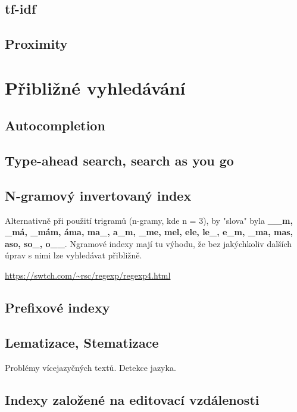 \documentclass[11pt]{article}
\begin{document}
\subsection{tf-idf}
\subsection{Proximity}

\section{Přibližné vyhledávání}

\subsection{Autocompletion}

\subsection{Type-ahead search, search as you go}

\subsection{N-gramový invertovaný index}
Alternativně při použití trigramů (n-gramy, kde n = 3), by "slova" byla
\textbf{\_\_m, \_má, \_mám, áma, ma\_, a\_m, \_me, mel, ele, le\_, e\_m, \_ma,
mas, aso, so\_, o\_\_}. Ngramové indexy mají tu výhodu, že bez jakýchkoliv
dalších úprav s nimi lze vyhledávat přibližně. 

\url{https://swtch.com/~rsc/regexp/regexp4.html}
\subsection{Prefixové indexy}

\subsection{Lematizace, Stematizace}
Problémy vícejazyčných textů. Detekce jazyka.

\subsection{Indexy založené na editovací vzdálenosti}
\end{document}
